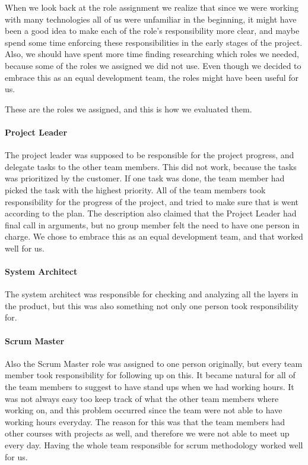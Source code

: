 When we look back at the role assignment we realize that since we were working with many technologies all of us were unfamiliar in the beginning, it might have been a good idea to make each of the role's responsibility more clear, and maybe spend some time enforcing these responsibilities in the early stages of the project. Also, we should have spent more time finding researching which roles we needed, because some of the roles we assigned we did not use. Even though we decided to embrace this as an equal development team, the roles might have been useful for us. 

These are the roles we assigned, and this is how we evaluated them.

\paragraph{Project Leader}
The project leader was supposed to be responsible for the project progress, and delegate tasks to the other team members. This did not work, because the tasks was prioritized by the customer. If one task was done, the team member had picked the task with the highest priority. All of the team members took responsibility for the progress of the project, and tried to make sure that is went according to the plan. The description also claimed that the Project Leader had final call in arguments, but no group member felt the need to have one person in charge. We chose to embrace this as an equal development team, and that worked well for us.

\paragraph{System Architect}
The system architect was responsible for checking and analyzing all the layers in the product, but this was also something not only one person took responsibility for. 

\paragraph{Scrum Master}
Also the Scrum Master role was assigned to one person originally, but every team member took responsibility for following up on this. It became natural for all of the team members to suggest to have stand ups when we had working hours. It was not always easy too keep track of what the other team members where working on, and this problem occurred since the team were not able to have working hours everyday. The reason for this was that the team members had other courses with projects as well, and therefore we were not able to meet up every day. Having the whole team responsible for scrum methodology worked well for us.

